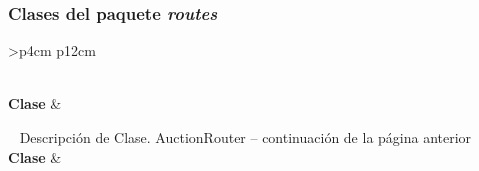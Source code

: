 \subsubsection{Clases del paquete \textit{routes}}
 \label{sec:descripcion_auctionrouter}
\begin{longtable}{
    >{}p{4cm}
    p{12cm}
    }
    \caption{Descripción de Clase. AuctionRouter} \label{table:descripcion_auctionrouter} \\
    \toprule
    \textbf{Clase} &  \\
    \endfirsthead
    
    {{ \tablename\ \thetable{} Descripción de Clase. AuctionRouter -- continuación de la página anterior}} \\
    \toprule
    \textbf{Clase} &  \\
    \midrule
    \endhead
    
    \midrule
     \\ 
    \endfoot
    
    \bottomrule
    \endlastfoot
    

\end{longtable}
